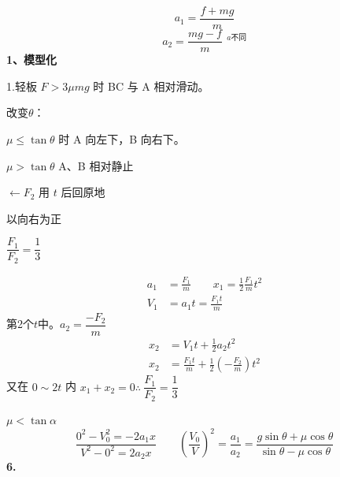 
\[
a_1=\frac{f+mg}{m}
\]
\[
a_2=\frac{mg-f}{m}\ \,{}^{a\text{不同}}
\]
\textbf{1、模型化}

1.轻板
$F>3\mu mg$ 时 BC 与 A 相对滑动。

改变$\theta$：

$\mu\le\tan\theta$ 时 A 向左下，B 向右下。 %

$\mu>\tan\theta$ A、B 相对静止 %
\begin{problem}
$\leftarrow F_2$ 用 $t$ 后回原地
\begin{solution}
以向右为正

$\dfrac{F_1}{F_2}=\dfrac13$

\begin{align*}
a_1&=\frac{F_1}{m}\qquad x_1=\frac12\frac{F_1}{m}t^2\\
V_1&=a_1t=\frac{F_1t}{m}
\end{align*}
第2个$t$中。$a_2=\dfrac{-F_2}{m}$
\begin{align*}
x_2&=V_1t+\frac12a_2t^2\\
x_2&=\frac{F_1t}{m}+\frac12\left(-\frac{F_2}{m}\right)t^2 %
\end{align*}
又在 $0\sim2t$ 内 $x_1+x_2=0$\quad $\therefore\ \dfrac{F_1}{F_2}=\dfrac13$
\end{solution}
\end{problem}
$\mu<\tan\alpha$
\[
\frac{0^2-V_0^2=-2a_1x}{V^2-0^2=2a_2x}\qquad
\left(\frac{V_0}{V}\right)^2=\frac{a_1}{a_2}=\frac{g\sin\theta+\mu\cos\theta}{\sin\theta-\mu\cos\theta}
\] %
\textbf{6.}

